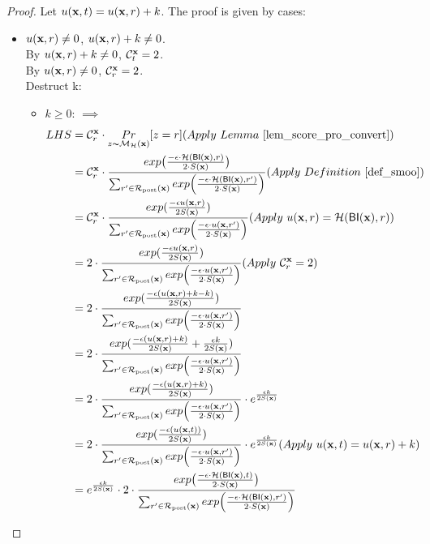 \documentclass{article}
\begin{document}
\begin{proof}
Let $u(\textbf{x}, {t}) = u(\textbf{x}, {r}) + k$. The proof is given by cases:
\begin{itemize}
  \item {\boldmath$u(\textbf{x}, {r}) \neq 0$, $u(\textbf{x}, {r}) + k \neq 0$}.  \\
  By $u(\textbf{x}, {r}) + k \neq 0$, $\mathcal{C}^{\textbf{x}}_{t} = 2$. \\
  By $u(\textbf{x}, {r}) \neq 0 $, $\mathcal{C}^{\textbf{x}}_{r} = 2$. \\
  Destruct k:
  \begin{itemize}
    \item  $k \geq 0$: $\implies$\\
      \begin{equation*}
      \begin{split}
      LHS 
      & = \cardinality{\dataobs}{r} \cdot \hexpmechPr{\dataobs}{z = r}     (Apply\ Lemma\ \ref{lem_score_pro_convert})\\
      & = \cardinality{\dataobs}{r} \cdot \frac {exp\big(\frac{-\epsilon\cdot\hellinger(\bysinfer(\dataobs),r)}{2\cdot S(\dataobs)}\big)}{\nomalizer{\dataobs}} 
      (Apply\ Definition\ \ref{def_smoo})\\
      & = \cardinality{\dataobs}{r} \cdot \frac{exp(\frac{-\epsilon \ux{r}}{2 S(\dataobs)})}{\unomalizer{\dataobs}}
      (Apply\ \ux{r} = \hellinger(\bysinfer(\dataobs), r))\\
      & = 2 \cdot \frac{exp(\frac{-\epsilon \ux{r}}{2 S(\dataobs)})}{\unomalizer{\dataobs}}                  (Apply\ \cardinality{\dataobs}{r} = 2)\\
      & = 2 \cdot \frac{exp(\frac{-\epsilon (\ux{r} + k - k)}{2 S(\dataobs)})}{\unomalizer{\dataobs}}\\
      & = 2 \cdot \frac{exp(\frac{-\epsilon (\ux{r} + k)}{2 S(\dataobs)} + \frac{\epsilon k}{2 S(\dataobs)})}{\unomalizer{\dataobs}}\\
      & = 2 \cdot \frac{exp(\frac{-\epsilon (\ux{r} + k)}{2 S(\dataobs)})}{\unomalizer{\dataobs}} \cdot e^{\frac{\epsilon k}{2 S(\dataobs)}}\\
      & = 2 \cdot \frac{exp(\frac{-\epsilon (\ux{t})}{2 S(\dataobs)})}{\unomalizer{\dataobs}} \cdot e^{\frac{\epsilon k}{2 S(\dataobs)}}  (Apply \ \ux{t} = \ux{r} + k)\\
      & = e^{\frac{\epsilon k}{2 S(\dataobs)}} \cdot 2 \cdot \frac {exp\big(\frac{-\epsilon\cdot\hellinger(\bysinfer(\dataobs), t)}{2\cdot S(\dataobs)}\big)}{\nomalizer{\dataobs}} 

\end{split}
\end{equation*}
\end{itemize}
\end{itemize}
\end{proof}
\end{document}
